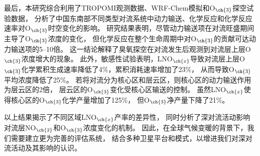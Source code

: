 {最后，本研究综合利用了TROPOMI观测数据、WRF-Chem模拟和O$_{\ch{3}}$探空试验数据，
分析了中国东南部不同类型对流系统中动力输送、化学反应和化学反应速率对O$_{\ch{3}}$时空变化的影响。
研究结果表明，尽管动力输送项在对流旺盛期间主导了O$_{\ch{3}}$浓度的变化，
但化学反应在整个生命周期中对O$_{\ch{3}}$的贡献可达动力输送项的5--10倍。
这一结论解释了臭氧探空在对流发生后观测到对流层上层O$_{\ch{3}}$浓度增大的现象。
此外，敏感性试验表明，LNO$_{\ch{x}}$导致对流层上层O$_{\ch{3}}$化学累积生成速率降低了4\%，累积消耗速率增加了23\%，
从而导致O$_{\ch{3}}$平均浓度降低了25\%。
若将对流分为核心区和层云区，则核心区的动力输送作用为层云区的2倍，
层云区的O$_{\ch{3}}$变化受核心区输送的控制。
虽然LNO$_{\ch{x}}$使得核心区的O$_{\ch{3}}$化学产量增加了125\%，
但O$_{\ch{3}}$净产量下降了21\%。

以上结果揭示了不同区域LNO$_{\ch{x}}$产率的差异性，
同时分析了深对流活动影响对流层NO$_{\ch{2}}$和O$_{\ch{3}}$浓度变化的机制。
因此，在全球气候变暖的背景下，我们需要建立更为完善的评估系统，
结合多种卫星平台和模式，以增进我们对深对流活动及其影响的认识。
}
